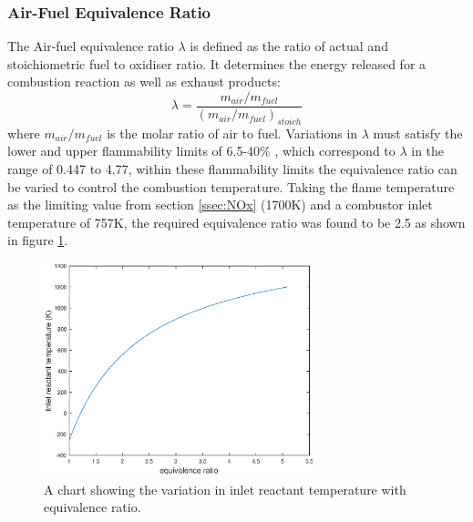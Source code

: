 \documentclass[11pt, oneside]{article}
\begin{document}
\subsubsection{Air-Fuel Equivalence Ratio} 
The Air-fuel equivalence ratio $\lambda$ is defined as the ratio of actual and stoichiometric fuel to oxidiser ratio. It determines the energy released for a combustion reaction as well as exhaust products: \begin{equation}
\lambda = \frac{m_{air}/m_{fuel}}{(m_{air}/m_{fuel})_{stoich}}
\end{equation}
where $m_{air}/m_{fuel}$ is the molar ratio of air to fuel. Variations in $\lambda$ must satisfy the lower and upper flammability limits of 6.5-40\% \cite{FL}, which correspond to $\lambda$ in the range of 0.447 to 4.77, within these flammability limits the equivalence ratio can be varied to control the combustion temperature.
Taking the flame temperature as the limiting value from section \ref{ssec:NOx} (1700K) and a combustor inlet temperature of 757K, the required equivalence ratio was found to be 2.5 as shown in figure \ref{fig:flametemp}.

\begin{figure} [h]
\centering
\includegraphics[width=0.7\textwidth]{./pictures/combustor.eps}
  \caption{A chart showing the variation in inlet reactant temperature with equivalence ratio.} \label{fig:flametemp}
  \end{figure} 
\end{document}
